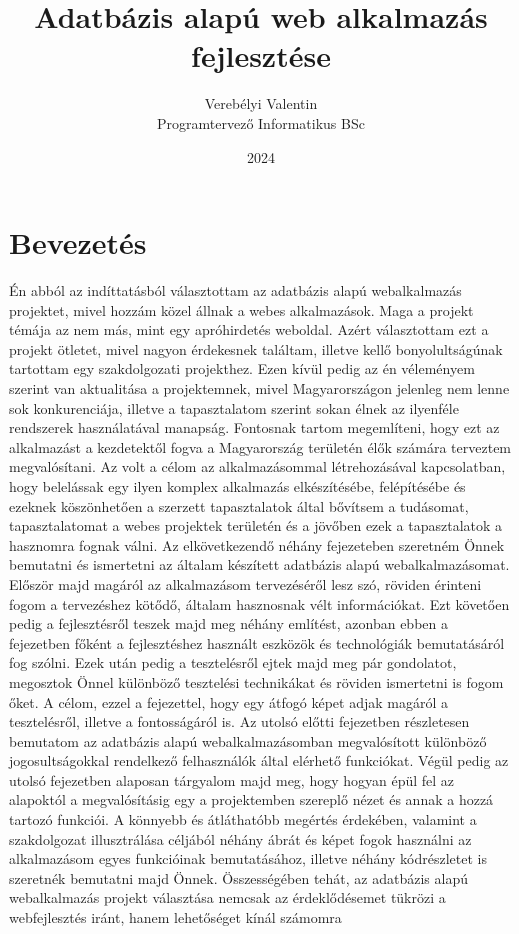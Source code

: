 \documentclass[]{thesis-ekf}
\theoremstyle{definition}
\theoremstyle{remark}
\begin{document}
	\title{Adatbázis alapú web alkalmazás fejlesztése}
	\author{Verebélyi Valentin\\Programtervező Informatikus BSc}
	\date{2024}
	\maketitle
	\tableofcontents
	
	\chapter*{Bevezetés}
	Én abból az indíttatásból választottam az adatbázis alapú webalkalmazás projektet, mivel hozzám közel állnak a webes alkalmazások. Maga a projekt témája az nem más, mint egy apróhirdetés weboldal. Azért választottam ezt a projekt ötletet, mivel nagyon érdekesnek találtam, illetve kellő bonyolultságúnak tartottam egy szakdolgozati projekthez. Ezen kívül pedig az én véleményem szerint van aktualitása a projektemnek, mivel Magyarországon jelenleg nem lenne sok konkurenciája, illetve a tapasztalatom szerint sokan élnek az ilyenféle rendszerek használatával manapság. Fontosnak tartom megemlíteni, hogy ezt az alkalmazást a kezdetektől fogva a Magyarország területén élők számára terveztem megvalósítani. Az volt a célom az alkalmazásommal létrehozásával kapcsolatban, hogy belelássak egy ilyen komplex alkalmazás elkészítésébe, felépítésébe és ezeknek köszönhetően a szerzett tapasztalatok által bővítsem a tudásomat, tapasztalatomat a webes projektek területén és a jövőben ezek a tapasztalatok a hasznomra fognak válni. Az elkövetkezendő néhány fejezeteben szeretném Önnek bemutatni és ismertetni az általam készített adatbázis alapú webalkalmazásomat. Először majd magáról az alkalmazásom tervezéséről lesz szó, röviden érinteni fogom a tervezéshez kötődő, általam hasznosnak vélt információkat. Ezt követően pedig a fejlesztésről teszek majd meg néhány említést, azonban ebben a fejezetben főként a fejlesztéshez használt eszközök és technológiák bemutatásáról fog szólni. Ezek után pedig a tesztelésről ejtek majd meg pár gondolatot, megosztok Önnel különböző tesztelési technikákat és röviden ismertetni is fogom őket. A célom, ezzel a fejezettel, hogy egy átfogó képet adjak magáról a tesztelésről, illetve a fontosságáról is. Az utolsó előtti fejezetben részletesen bemutatom az adatbázis alapú webalkalmazásomban megvalósított különböző jogosultságokkal rendelkező felhasználók által elérhető funkciókat. Végül pedig az utolsó fejezetben alaposan tárgyalom majd meg, hogy hogyan épül fel az alapoktól a megvalósításig egy a projektemben szereplő nézet és annak a hozzá tartozó funkciói. A könnyebb és átláthatóbb megértés érdekében, valamint a szakdolgozat illusztrálása céljából néhány ábrát és képet fogok használni az alkalmazásom egyes funkcióinak bemutatásához, illetve néhány kódrészletet is szeretnék bemutatni majd Önnek. Összességében tehát, az adatbázis alapú webalkalmazás projekt választása nemcsak az érdeklődésemet tükrözi a webfejlesztés iránt, hanem lehetőséget kínál számomra 
\end{document}
